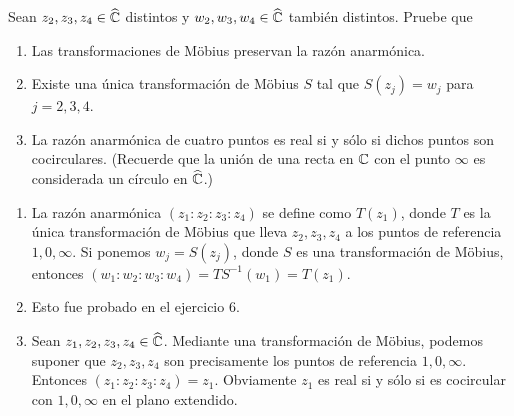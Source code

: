 \begin{exercise}
Sean $z_2, z_3, z_4 \in \widehat {\mathbb C}$ distintos y $w_2, w_3, w_4 \in \widehat {\mathbb C}$ también distintos. Pruebe que
\begin{enumerate}[label=(\alph*)]
    \item Las transformaciones de Möbius preservan la razón anarmónica.
    \item Existe una única transformación de Möbius $S$ tal que $S(z_j) = w_j$ para $j = 2,3,4$.
    \item La razón anarmónica de cuatro puntos es real si y sólo si dichos puntos son cocirculares. (Recuerde que la unión de una recta en $\mathbb C$ con el punto $\infty$ es considerada un círculo en $\widehat {\mathbb C}$.)
\end{enumerate}
\end{exercise}

\begin{solution}
\leavevmode
\begin{enumerate}[label=(\alph*)]
    \item La razón anarmónica $(z_1 : z_2 : z_3 : z_4)$ se define como $T(z_1)$, donde $T$ es la única transformación de Möbius que lleva $z_2, z_3, z_4$ a los puntos de referencia $1, 0, \infty$. Si ponemos $w_j = S(z_j)$, donde $S$ es una transformación de Möbius, entonces $(w_1 : w_2 : w_3 : w_4) = TS^{-1}(w_1) = T(z_1)$.
    
    \item Esto fue probado en el ejercicio 6.
    
    \item Sean $z_1, z_2, z_3, z_4 \in \widehat {\mathbb C}$. Mediante una transformación de Möbius, podemos suponer que $z_2, z_3, z_4$ son precisamente los puntos de referencia $1, 0, \infty$. Entonces $(z_1 : z_2 : z_3 : z_4) = z_1$. Obviamente $z_1$ es real si y sólo si es cocircular con $1, 0, \infty$ en el plano extendido.
\end{enumerate}
\end{solution}

